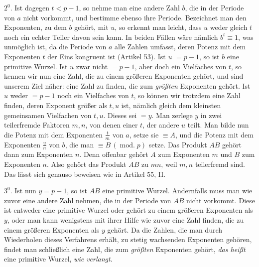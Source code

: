 $2^0$. Ist dagegen $t<p-1$, so nehme man eine andere Zahl $b$, die in der Periode von $a$ nicht vorkommt, und bestimme ebenso ihre Periode. Bezeichnet man den Exponenten, zu dem $b$ gehört, mit $u$, so erkennt man leicht, dass $u$ weder gleich $t$ noch ein echter Teiler davon sein kann. In beiden Fällen wäre nämlich $b^t\equiv1$, was unmöglich ist, da die Periode von $a$ alle Zahlen umfasst, deren Potenz mit dem Exponenten $t$ der Eins kongruent ist (Artikel 53). Ist $u$ $=p-1$, so ist $b$ eine primitive Wurzel. Ist $u$ zwar nicht $=p-1$, aber doch ein Vielfaches von $t$, so kennen wir nun eine Zahl, die zu einem größeren Exponenten gehört, und sind unserem Ziel näher: eine Zahl zu finden, die zum \emph{größten} Exponenten gehört. Ist $u$ weder $=p-1$ noch ein Vielfaches von $t$, so können wir trotzdem eine Zahl finden, deren Exponent größer als $t,u$ ist, nämlich gleich dem kleinsten gemeinsamen Vielfachen von $t,u$. Dieses sei $=y$. Man zerlege $y$ in zwei teilerfremde Faktoren $m,n$, von denen einer $t$, der andere $u$ teilt. Man bilde nun die Potenz mit dem Exponenten $\frac{t}{m}$ von $a$, setze sie $\equiv A$, und die
Potenz mit dem Exponenten $\frac{u}{n}$ von $b$, die man $\equiv B\,(\operatorname{mod.}p)$ setze. Das Produkt $AB$ gehört dann zum Exponenten $n$. Denn offenbar gehört $A$ zum Exponenten $m$ und $B$ zum Exponenten $n$. Also gehört das Produkt $AB$ zu $mn$, weil $m,n$ teilerfremd sind. Das lässt sich genauso beweisen wie in Artikel 55, II.

$3^0$. Ist nun $y=p-1$, so ist $AB$ eine primitive Wurzel. Andernfalls muss man wie zuvor eine andere Zahl nehmen, die in der Periode von $AB$ nicht vorkommt. Diese ist entweder eine primitive Wurzel oder gehört zu einem größeren Exponenten als $y$, oder man kann wenigstens mit ihrer Hilfe wie zuvor eine Zahl finden, die zu einem größeren Exponenten als $y$ gehört. Da die Zahlen, die man durch Wiederholen dieses Verfahrens erhält, zu stetig wachsenden Exponenten gehören, findet man schließlich eine Zahl, die zum \emph{größten} Exponenten gehört, \emph{das heißt} eine primitive Wurzel, \emph{wie verlangt.}

